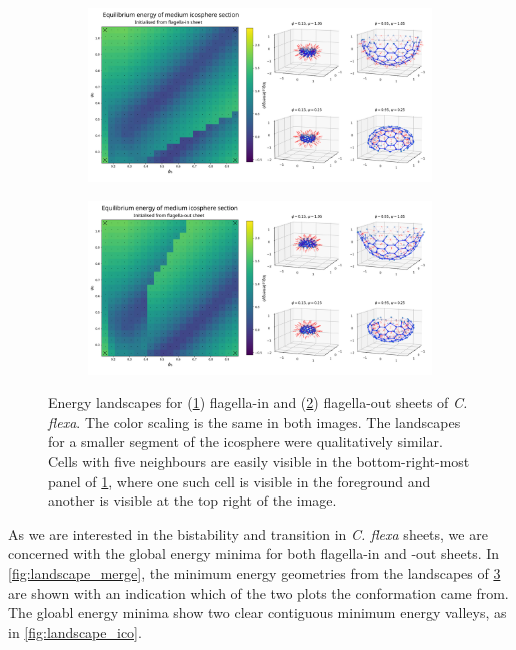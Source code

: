 \begin{figure}
	\centering
	\begin{subfigure}[b]{\textwidth}
		\centering
		\includegraphics[width=\textwidth]{landscape_ico3.png}
		\caption{}
		\label{subfig:landscape_ico3}
	\end{subfigure}
	\begin{subfigure}[b]{\textwidth}
		\centering
		\includegraphics[width=\textwidth]{landscape_ico3r.png}
		\caption{}
		\label{subfig:landscape_ico3r}
	\end{subfigure}
	\caption[Energy landscape for flagella-in and flagella-out curved sheets]{Energy landscapes for (\ref{subfig:landscape_ico3}) flagella-in and (\ref{subfig:landscape_ico3r}) flagella-out sheets of \textit{C. flexa}. The color scaling is the same in both images. The landscapes for a smaller segment of the icosphere were qualitatively similar. Cells with five neighbours are easily visible in the bottom-right-most panel of \ref{subfig:landscape_ico3}, where one such cell is visible in the foreground and another is visible at the top right of the image.}
	\label{fig:landscape_ico3}
\end{figure}

As we are interested in the bistability and transition in \textit{C. flexa} sheets, we are concerned with the global energy minima for both flagella-in and -out sheets. 
In \cref{fig:landscape_merge}, the minimum energy geometries from the landscapes of \cref{fig:landscape_ico3} are shown with an indication which of the two plots the conformation came from.
The gloabl energy minima show two clear contiguous minimum energy valleys, as in \cref{fig:landscape_ico}.

